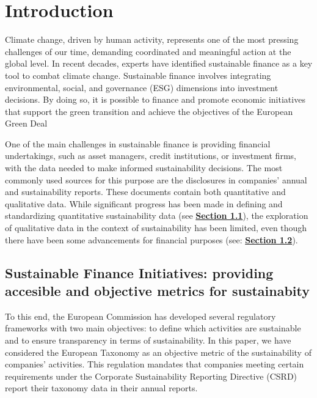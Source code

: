\documentclass[times]{oupau}
\begin{document}

\section{Introduction}

Climate change, driven by human activity, represents one of the most pressing challenges of our time, demanding coordinated and meaningful action at the global level. In recent decades, experts have identified sustainable finance as a key tool to combat climate change. Sustainable finance involves integrating environmental, social, and governance (ESG) dimensions into investment decisions. By doing so, it is possible to finance and promote economic initiatives that support the green transition and achieve the objectives of the European Green Deal\cite{european_commission_2020}
\par
\justify

One of the main challenges in sustainable finance is providing financial undertakings, such as asset managers, credit institutions, or investment firms, with the data needed to make informed sustainability decisions. The most commonly used sources for this purpose are the disclosures in companies' annual and sustainability reports. These documents contain both quantitative and qualitative data. While significant progress has been made in defining and standardizing quantitative sustainability data (see \hyperref[subsec:sustainable_finance]{\textbf{Section 1.1}}), the exploration of qualitative data in the context of sustainability has been limited, even though there have been some advancements for financial purposes (see: \hyperref[subsec:nlp]{\textbf{Section 1.2}})\cite{eccles_serafeim_2013}.
\par
\justify


\subsection{Sustainable Finance Initiatives: providing accesible and objective metrics for sustainabity}
\label{subsec:sustainable_finance}

To this end, the European Commission has developed several regulatory frameworks with two main objectives: to define which activities are sustainable and to ensure transparency in terms of sustainability. In this paper, we have considered the European Taxonomy as an objective metric of the sustainability of companies' activities. This regulation mandates that companies meeting certain requirements under the Corporate Sustainability Reporting Directive (CSRD) report their taxonomy data in their annual reports.
\par
\justify
\end{document}

